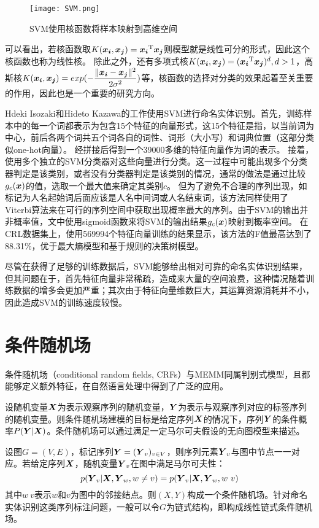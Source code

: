 \begin{figure}[!htpb]
    \centering
    \texttt{[image: SVM.png]}
    \caption{SVM使用核函数将样本映射到高维空间}
    \label{fig:SVM}
\end{figure}

可以看出，若核函数取$K(\boldsymbol{x_i}, \boldsymbol{x_j}) = \boldsymbol{x_i}^{\mathrm{T}}\boldsymbol{x_j}$则模型就是线性可分的形式，因此这个核函数也称为线性核。
除此之外，还有多项式核$K(\boldsymbol{x_i}, \boldsymbol{x_j}) = (\boldsymbol{x_i}^{\mathrm{T}}\boldsymbol{x_j})^d, d>1$，高斯核$K(\boldsymbol{x_i}, \boldsymbol{x_j}) = exp(-\dfrac{\lVert\boldsymbol{x_i} - \boldsymbol{x_j}\rVert^2}{2\sigma^2})$等，核函数的选择对分类的效果起着至关重要的作用，因此也是一个重要的研究方向。

Hdeki Isozaki和Hideto Kazawa的工作使用SVM进行命名实体识别。首先，训练样本中的每一个词都表示为包含15个特征的向量形式，这15个特征是指，以当前词为中心，前后各两个词共五个词各自的词性、词形（大小写）和词典位置（这部分类似one-hot向量）。
经拼接后得到一个39000多维的特征向量作为词的表示。
接着，使用多个独立的SVM分类器对这些向量进行分类。这一过程中可能出现多个分类器判定是该类别，或者没有分类器判定是该类别的情况，通常的做法是通过比较$g_c (\boldsymbol{x})$的值，选取一个最大值来确定其类别$c$。
但为了避免不合理的序列出现，如标记为人名起始词后面应该是人名中间词或人名结束词，该方法同样使用了Viterbi算法来在可行的序列空间中获取出现概率最大的序列。由于SVM的输出并非概率值，文中使用sigmoid函数来将SVM的输出结果$g_c (\boldsymbol{x})$映射到概率空间。
在CRL数据集上，使用569994个特征向量训练的结果显示，该方法的F值最高达到了88.31\%，优于最大熵模型和基于规则的决策树模型。

尽管在获得了足够的训练数据后，SVM能够给出相对可靠的命名实体识别结果，但其问题在于，首先特征向量非常稀疏，造成来大量的空间浪费，这种情况随着训练数据的增多会更加严重；其次由于特征向量维数巨大，其运算资源消耗并不小，因此造成SVM的训练速度较慢。

\section{条件随机场}
条件随机场（conditional random fields, CRFs）与MEMM同属判别式模型，且都能够定义额外特征，在自然语言处理中得到了广泛的应用。

设随机变量$\boldsymbol{X}$为表示观察序列的随机变量，$\boldsymbol{Y}$为表示与观察序列对应的标签序列的随机变量。则条件随机场建模的目标是给定序列$\boldsymbol{X}$的情况下，序列$\boldsymbol{Y}$的条件概率$P(\boldsymbol{Y}|\boldsymbol{X})$。条件随机场可以通过满足一定马尔可夫假设的无向图模型来描述。

设图$G=(V,E)$，标记序列$\boldsymbol{Y} = (\boldsymbol{Y}_v)_{v\in V}$，则序列元素$\boldsymbol{Y}_v$与图中节点一一对应。若给定序列$\boldsymbol{X}$，随机变量$\boldsymbol{Y}_v$在图中满足马尔可夫性：
\begin{equation}
    p(\boldsymbol{Y}_v|\boldsymbol{X}, \boldsymbol{Y}_w, w\neq v) = p(\boldsymbol{Y}_v|\boldsymbol{X},\boldsymbol{Y}_w,w~v)
    \label{eq:Markov-in-CRF}
\end{equation}
其中$w~v$表示$w$和$v$为图中的邻接结点。则$(X, Y)$构成一个条件随机场。针对命名实体识别这类序列标注问题，一般可以令$G$为链式结构，即构成线性链式条件随机场。

